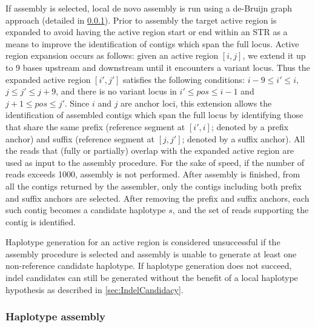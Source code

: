 \documentclass{article}
\begin{document}
If assembly is selected, local de novo assembly is run using a de-Bruijn graph approach (detailed in \ref{sec:HaplotypeAssembler}). Prior to assembly the target active region is expanded to avoid having the active region start or end within an STR as a means to improve the identification of contigs which span the full locus. Active region expansion occurs as follows: given an active region $[i,j]$, we extend it up to 9 bases upstream and downstream until it encounters a variant locus. Thus the expanded active region $[i',j']$ satisfies the following conditions: $i-9 \leq i' \leq i$, $j \leq j' \leq j+9$, and there is no variant locus in $i' \leq pos \leq i-1$ and $j+1 \leq pos \leq j'$. Since $i$ and $j$ are anchor loci, this extension allows the identification of assembled contigs which span the full locus by identifying those that share the same prefix (reference segment at $[i',i]$; denoted by a prefix anchor) and suffix (reference segment at $[j,j']$; denoted by a suffix anchor). All the reads that (fully or partially) overlap with the expanded active region are used as input to the assembly procedure. For the sake of speed, if the number of reads exceeds 1000, assembly is not performed. After assembly is finished, from all the contigs returned by the assembler, only the contigs including both prefix and suffix anchors are selected. After removing the prefix and suffix anchors, each such contig becomes a candidate haplotype $s$, and the set of reads supporting the contig is identified.

Haplotype generation for an active region is considered unsuccessful if the assembly procedure is selected and assembly is unable to generate at least one non-reference candidate haplotype. If haplotype generation does not succeed, indel candidates can still be generated without the benefit of a local haplotype hypothesis as described in \ref{sec:IndelCandidacy}.

\subsubsection{Haplotype assembly}
\label{sec:HaplotypeAssembler}
\end{document}
